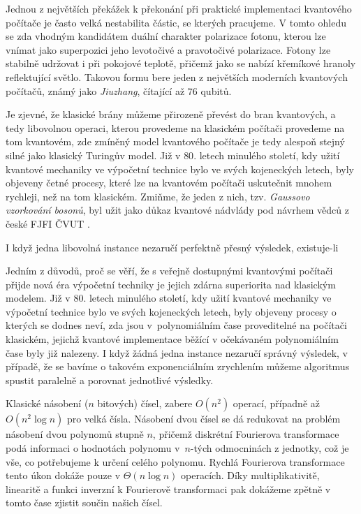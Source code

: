 \documentclass[12pt]{report}
\begin{document}
Jednou z největších překážek k překonání při praktické implementaci kvantového počítače je často velká nestabilita částic, se kterých pracujeme. V tomto ohledu se zda vhodným kandidátem duální charakter polarizace fotonu, kterou lze vnímat jako superpozici jeho levotočivé a pravotočivé polarizace. Fotony lze stabilně udržovat i při pokojové teplotě, přičemž jako  se nabízí křemíkové hranoly reflektující světlo. Takovou formu bere jeden z největších moderních kvantových počítačů, známý jako \textit{Jiuzhang}, čítající až $76$ qubitů. 


Je zjevné, že klasické brány můžeme přirozeně převést do bran kvantových, a tedy libovolnou operaci, kterou provedeme na klasickém počítači provedeme na tom kvantovém, zde zmíněný model kvantového počítače je tedy alespoň stejný silné jako klasický Turingův model. Již v $80$. letech minulého století, kdy užití kvantové mechaniky ve výpočetní technice bylo ve svých kojeneckých letech, byly objeveny četné procesy, které lze na kvantovém počítači uskutečnit mnohem rychleji, než na tom klasickém. Zmiňme, že jeden z nich, tzv. \textit{Gaussovo vzorkování bosonů}, byl užit jako důkaz kvantové nádvlády pod návrhem vědců z české FJFI ČVUT \cite{Science}.

I když jedna libovolná instance nezaručí perfektně přesný výsledek, existuje-li 

Jedním z důvodů, proč se věří, že s veřejně dostupnými kvantovými počítači přijde nová éra výpočetní techniky je jejich zdárna superiorita nad klasickým modelem. Již v 80. letech minulého století, kdy užití kvantové mechaniky ve výpočetní technice bylo ve svých kojeneckých letech, byly objeveny procesy o kterých se dodnes neví, zda jsou v~polynomiálním čase proveditelné na počítači klasickém, jejichž kvantové implementace běžící v očekávaném polynomiálním čase byly již nalezeny. I když žádná jedna instance nezaručí správný výsledek, v případě, že se bavíme o takovém exponenciálním zrychlením můžeme algoritmus spustit paralelně a porovnat jednotlivé výsledky.


Klasické násobení ($n$ bitových) čísel, zabere $O(n^2)$ operací, případně až $O(n^2 \log n)$ pro velká čísla. Násobení dvou čísel se dá redukovat na problém násobení dvou polynomů stupně $n$, přičemž diskrétní Fourierova transformace podá informaci o hodnotách polynomu v~$n$-tých odmocninách z jednotky, což je vše, co potřebujeme k určení celého polynomu. Rychlá Fourierova transformace tento úkon dokáže pouze v $\Theta(n \log n)$ operacích. Díky multiplikativitě, linearitě a funkci inverzní k Fourierově transformaci pak dokážeme zpětně v tomto čase zjistit součin našich čísel.
\end{document}
